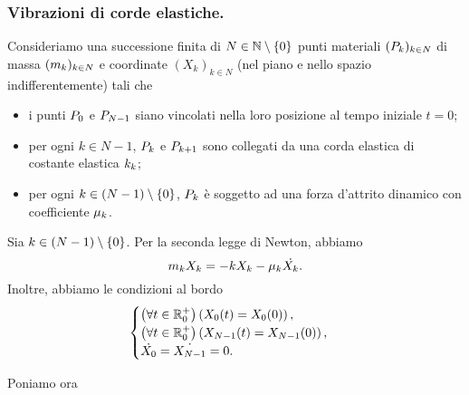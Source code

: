 \subsubsection{Vibrazioni di corde elastiche.}
\label{CalcoloScientifico_VibrazioniDiCordeElastiche}
\par Consideriamo una successione finita di
$N \in \mathbb{N} \setminus \lbrace 0 \rbrace$ punti materiali
$(P_k)_{k \in N}$ di massa $(m_k)_{k \in N}$
e coordinate $(X_k)_{k \in N}$ (nel piano e nello spazio indifferentemente)
tali che
\begin{itemize}
  \item i punti $P_0$ e $P_{N - 1}$ siano vincolati
    nella loro posizione al tempo iniziale $t = 0$;
  \item per ogni $k \in N - 1$, $P_k$ e $P_{k + 1}$
    sono collegati da una corda elastica di costante elastica
    $k_k$;
  \item per ogni $k \in (N - 1) \setminus \lbrace 0 \rbrace$, $P_k$ \`e soggetto
    ad una forza d'attrito dinamico con coefficiente $\mu_k$.
\end{itemize}
\par Sia $k \in (N - 1) \setminus \lbrace 0 \rbrace$. Per la seconda legge di Newton, abbiamo
\[
  m_k X_k = - k X_k - \mu_k \dot{X_k}.
\]
Inoltre, abbiamo le condizioni al bordo
\[
  \begin{cases}
    \left ( \forall t \in \mathbb{R}^+_0 \right ) \left ( X_0(t) = X_0(0) \right ),\\
    \left ( \forall t \in \mathbb{R}^+_0 \right ) \left ( X_{N - 1}(t) = X_{N - 1}(0) \right ),\\
    \dot{X_0} = \dot{X_{N - 1}} = 0.
  \end{cases}
\]
\par Poniamo ora
